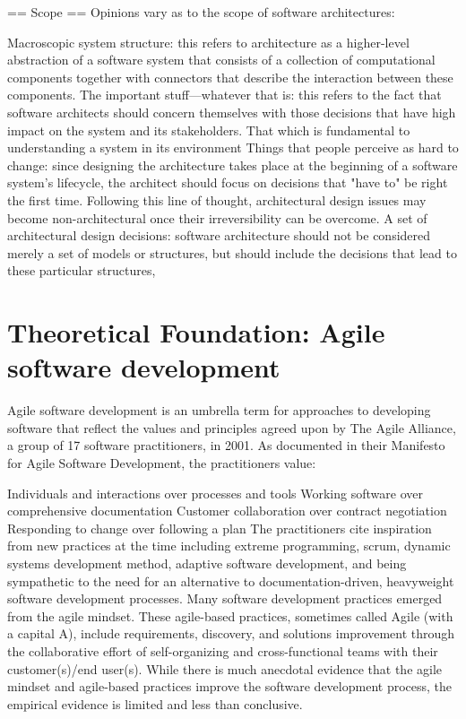 \documentclass[12pt,a4paper]{report}
\begin{document}
== Scope ==
Opinions vary as to the scope of software architectures:

Macroscopic system structure: this refers to architecture as a higher-level abstraction of a software system that consists of a collection of computational components together with connectors that describe the interaction between these components.
The important stuff—whatever that is: this refers to the fact that software architects should concern themselves with those decisions that have high impact on the system and its stakeholders.
That which is fundamental to understanding a system in its environment
Things that people perceive as hard to change: since designing the architecture takes place at the beginning of a software system's lifecycle, the architect should focus on decisions that "have to" be right the first time. Following this line of thought, architectural design issues may become non-architectural once their irreversibility can be overcome.
A set of architectural design decisions: software architecture should not be considered merely a set of models or structures, but should include the decisions that lead to these particular structures, 

\section{Theoretical Foundation: Agile software development}
Agile software development is an umbrella term for approaches to developing software that reflect the values and principles agreed upon by The Agile Alliance, a group of 17 software practitioners, in 2001. As documented in their Manifesto for Agile Software Development, the practitioners value: 

Individuals and interactions over processes and tools
Working software over comprehensive documentation
Customer collaboration over contract negotiation
Responding to change over following a plan
The practitioners cite inspiration from new practices at the time including extreme programming, scrum, dynamic systems development method, adaptive software development, and being sympathetic to the need for an alternative to documentation-driven, heavyweight software development processes.
Many software development practices emerged from the agile mindset. These agile-based practices, sometimes called Agile (with a capital A), include requirements, discovery, and solutions improvement through the collaborative effort of self-organizing and cross-functional teams with their customer(s)/end user(s).
While there is much anecdotal evidence that the agile mindset and agile-based practices improve the software development process, the empirical evidence is limited and less than conclusive.
\end{document}
